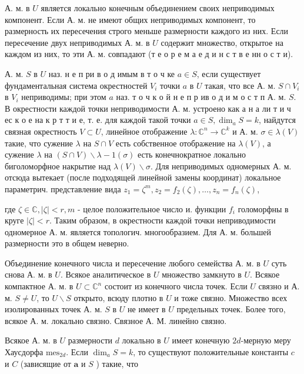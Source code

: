 \documentclass[10pt]{article}
\begin{document}
А. м. в $U$ является локально конечным объединением своих неприводимых компонент. Если А. м. не имеют общих неприводимых компонент, то размерность их пересечения строго меньше размерности каждого из них. Если пересечение двух неприводимых А. м. в $U$ содержит множество, открытое на каждом из них, то эти А. м. совпадают (т е о р е м а е д и н с т в е нн о с т и).



А. м. $S$ в $U$ наз. н е п ри в о д имым в т о ч ке $a \in S$, если существует фундаментальная система окрестностей $V_{i}$ точки $a$ в $U$ такая, что все А. м. $S \cap V_{i}$ в $V_{i}$ неприводимы; при этом $a$ наз. т о ч к о й н е п р ив о д и м о с т п А. м. $S$. В окрестности каждой точки неприводимости А. м. устроено как а н а ли т и ч ес к о е на к р т т и е, т. е. для каждой такой точки $a \in S, \operatorname{dim}_{a} S=k$, найдутся связная окрестность $V \subset U$, линейное отображение $\lambda: \mathbb{C}^{n} \rightarrow \mathbb{C}^{k}$ и А. м. $\sigma \in \lambda(V)$ такие, что сужение $\lambda$ на $S \cap V$ есть собственное отображение на $\lambda(V)$, а сужение $\lambda$ на $(S \cap V) \backslash \lambda-1(\sigma)$ есть конечнократное локально биголоморфное накрытие над $\lambda(V) \backslash \sigma$. Для неприводимых одномерных А. м. отсюда вытекает (после подходящей линейной замены координат) локальное параметрич. представление вида $z_{1}=\zeta^{m}, z_{2}=f_{2}(\zeta), \ldots, z_{n}=f_{n}(\zeta)$,



где $\zeta \in \mathbb{C},|\zeta|<r, m$ - целое положительное число и. функции $f_{i}$ голоморфны в круге $|\zeta|<r$. Таким образом, в окрестности каждой точки неприводимости одномерное А. м. является топологич. многообразием. Для А. м. большей размерности это в общем неверно.



Объединение конечного числа и пересечение любого семейства А. м. в $U$ суть снова А. м. в $U$. Всякое аналитическое в $U$ множество замкнуто в $U$. Всякое компактное А. м. в $U \subset \mathbb{C}^{n}$ состоит из конечного числа точек. Если $U$ связно и А. м. $S \neq U$, то $U \backslash S$ открыто, всюду плотно в $U$ и тоже связно. Множество всех изолированных точек А. м. $S$ в $U$ не имеет в $U$ предельных точек. Более того, всякое А. м. локально связно. Связное А. М. линейно связно.



Всякое А. м. в $U$ размерности $d$ локально в $U$ имеет конечную $2 d$-мерную меру Хаусдорфа $\mathrm{mes}_{2 d}$. Если $\operatorname{dim}_{a} S=k$, то существуют положительные константы $c$ и $C$ (зависящие от $\boldsymbol{a}$ и $S$ ) такие, что
\end{document}
